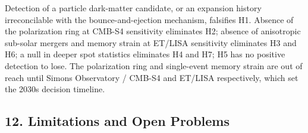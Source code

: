 \documentclass[
]{article}
\begin{document}
Detection of a particle dark-matter candidate, or an expansion history
irreconcilable with the bounce-and-ejection mechanism, falsifies H1.
Absence of the polarization ring at CMB-S4 sensitivity eliminates H2;
absence of anisotropic sub-solar mergers and memory strain at ET/LISA
sensitivity eliminates H3 and H6; a null in deeper spot statistics
eliminates H4 and H7; H5 has no positive detection to lose. The
polarization ring and single-event memory strain are out of reach until
Simons Observatory / CMB-S4 and ET/LISA respectively, which set the
2030s decision timeline.

\hypertarget{limitations-and-open-problems}{%
\subsection{\texorpdfstring{\textbf{12. Limitations and Open
Problems}}{12. Limitations and Open Problems}}\label{limitations-and-open-problems}}
\end{document}

